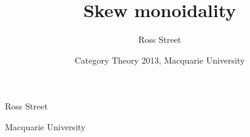 \documentclass{beamer}
\title%
{\textbf{Skew monoidality}}
\author{Ross Street}
\institute{Macquarie University}
\date[July 2013]{\small Category Theory 2013, Macquarie University}
\begin{document}


\begin{frame}%

  \begin{centering}
    {\inserttitle

\medskip 

{\small Ross Street}

{\small Macquarie University} 

\medskip
{}
}

\vfill

\centerline{\insertdate}

  \end{centering}


\end{frame}




\end{document}
